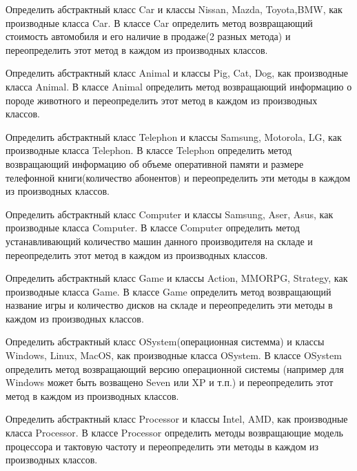 

\task Определить абстрактный класс Car и классы Nissan, Mazda,
Toyota,BMW, как производные класса Car. В классе Car определить метод
возвращающий стоимость автомобиля и его наличие в продаже(2 разных
метода) и переопределить этот метод в каждом из производных классов.

\task Определить абстрактный класс Animal и классы Pig, Cat, Dog, как
производные класса Animal. В классе Animal определить метод
возвращающий информацию о породе животного и переопределить этот метод
в каждом из производных классов.

\task Определить абстрактный класс Telephon и классы Samsung,
Motorola, LG, как производные класса Telephon. В классе Telephon
определить метод возвращающий информацию об объеме оперативной памяти
и размере телефонной книги(количество абонентов) и переопределить эти
методы в каждом из производных классов.

\task Определить абстрактный класс Computer и классы Samsung, Aser,
Asus, как производные класса Computer. В классе Computer определить
метод устанавливающий количество машин данного производителя на складе
и переопределить этот метод в каждом из производных классов.

\task Определить абстрактный класс Game и классы Action, MMORPG,
Strategy, как производные класса Game. В классе Game определить метод
возвращающий название игры и количество дисков на складе и
переопределить эти методы в каждом из производных классов.

\task Определить абстрактный класс OSystem(операционная системма) и
классы Windows, Linux, MacOS, как производные класса OSystem. В классе
OSystem определить метод возвращающий версию операционной системы
(например для Windows может быть возващено Seven или XP и т.п.) и
переопределить этот метод в каждом из производных классов.

\task Определить абстрактный класс Processor и классы Intel, AMD, как
производные класса Processor. В классе Processor определить методы
возвращающие модель процессора и тактовую частоту и переопределить эти
методы в каждом из производных классов.

